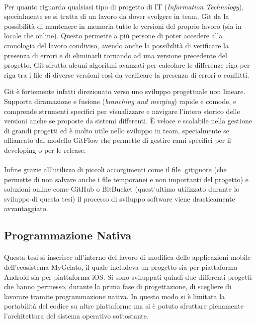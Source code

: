 \paragraph{}
Per quanto riguarda qualsiasi tipo di progetto di IT (\textit{Information Technology}), specialmente se si tratta di un lavoro da dover svolgere in team, Git da la possibilità di mantenere in memoria tutte le versioni del proprio lavoro (sia in locale che online).
Questo permette a più persone di poter accedere alla cronologia del lavoro condiviso, avendo anche la possibilità di verificare la presenza di errori e di eliminarli tornando ad una versione precedente del progetto.
Git sfrutta alcuni algoritmi avanzati per calcolare le differenze riga per riga tra i file di diverse versioni così da verificare la presenza di errori o conflitti.

Git è fortemente infatti direzionato verso uno sviluppo progettuale non lineare. Supporta diramazione e fusione (\textit{branching and merging}) rapide e comode, e comprende strumenti specifici per visualizzare e navigare l'intero storico delle versioni anche se proposte da sistemi differenti.
È veloce e scalabile nella gestione di grandi progetti ed è molto utile nello sviluppo in team, specialmente se affiancato dal modello GitFlow che permette di gestire rami specifici per il developing o per le release.

\paragraph{}
Infine grazie all'utilizzo di piccoli accorgimenti come il file .gitignore (che permette di non salvare anche i file temporanei e non importanti del progetto) e soluzioni online come GitHub o BitBucket (quest'ultimo utilizzato durante lo sviluppo di questa tesi) il processo di sviluppo software viene drasticamente avvantaggiato.

\subsection{Programmazione Nativa}
\paragraph{}

Questa tesi si inserisce all'interno del lavoro di modifica delle applicazioni mobile dell'ecosistema MyGelato, il quale includeva un progetto sia per piattaforma Android sia per piattaforma iOS.
Si sono sviluppati quindi due differenti progetti che hanno permesso, durante la prima fase di progettazione, di scegliere di lavorare tramite programmazione nativa.
In questo modo si è limitata la portabilità del codice su altre piattaforme ma si è potuto sfruttare pienamente l'architettura del sistema operativo sottostante.  

